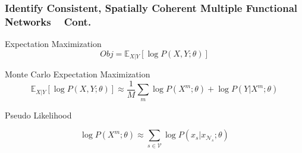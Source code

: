 \documentclass[serif]{beamer}
\begin{document}
\begin{frame}
\frametitle{Identify Consistent, Spatially Coherent Multiple Functional Networks ~\cite{liu2011monteCopy} Cont.}

\begin{block}{Expectation Maximization}
  \begin{equation*}
    Obj = \mathbb{E}_{X|Y} [\log P(X,Y;\theta)]
  \end{equation*}
\end{block}

\begin{block}{Monte Carlo Expectation Maximization}
  \begin{equation*}
    \mathbb{E}_{X|Y} [\log P(X,Y;\theta)] \approx \frac{1}{M}\sum_m \log P(X^m; \theta) + \log P(Y|X^m; \theta)
  \end{equation*}
\end{block}

\begin{block}{Pseudo Likelihood}

  \begin{equation*}
    \log P(X^m; \theta) \approx \sum_{s\in \mathcal{V}} \log P(x_s | x_{\mathcal{N}_s};\theta)
  \end{equation*}
\end{block}
\end{frame}
\end{document}
